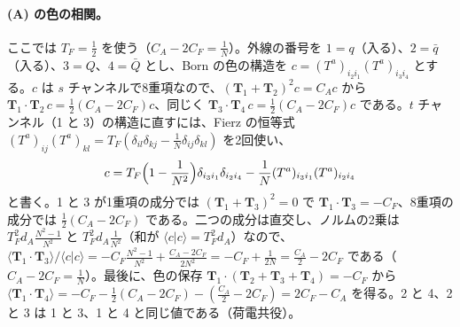 \documentclass[a4paper,10pt]{ltjsarticle}
\begin{document}
\paragraph{(A) の色の相関。}ここでは $T_F=\frac12$ を使う（$C_A-2C_F=\frac1N$）。外線の番号を $1=q$（入る）、$2=\bar q$（入る）、$3=Q$、$4=\bar Q$ とし、Born の色の構造を $c=(T^a)_{i_2i_1}(T^a)_{i_3i_4}$ とする。$c$ は $s$ チャンネルで8重項なので、$(\boldsymbol T_1+\boldsymbol T_2)^2c=C_Ac$ から $\boldsymbol T_1\cdot\boldsymbol T_2\,c=\frac12(C_A-2C_F)c$、同じく $\boldsymbol T_3\cdot\boldsymbol T_4\,c=\frac12(C_A-2C_F)c$ である。$t$ チャンネル（1 と 3）の構造に直すには、Fierz の恒等式 $(T^a)_{ij}(T^a)_{kl}=T_F(\delta_{il}\delta_{kj}-\frac1N\delta_{ij}\delta_{kl})$ を2回使い、
\begin{equation*}
c=T_F\Bigl(1-\frac1{N^2}\Bigr)\delta_{i_3i_1}\delta_{i_2i_4}-\frac1N(T^a)_{i_3i_1}(T^a)_{i_2i_4}
\end{equation*}
と書く。1 と 3 が1重項の成分では $(\boldsymbol T_1+\boldsymbol T_3)^2=0$ で $\boldsymbol T_1\cdot\boldsymbol T_3=-C_F$、8重項の成分では $\frac12(C_A-2C_F)$ である。二つの成分は直交し、ノルムの2乗は $T_F^2d_A\frac{N^2-1}{N^2}$ と $T_F^2d_A\frac1{N^2}$（和が $\langle c|c\rangle=T_F^2d_A$）なので、$\langle\boldsymbol T_1\cdot\boldsymbol T_3\rangle/\langle c|c\rangle=-C_F\frac{N^2-1}{N^2}+\frac{C_A-2C_F}{2N^2}=-C_F+\frac1{2N}=\frac{C_A}2-2C_F$ である（$C_A-2C_F=\frac1N$）。最後に、色の保存 $\boldsymbol T_1\cdot(\boldsymbol T_2+\boldsymbol T_3+\boldsymbol T_4)=-C_F$ から $\langle\boldsymbol T_1\cdot\boldsymbol T_4\rangle=-C_F-\frac12(C_A-2C_F)-(\frac{C_A}2-2C_F)=2C_F-C_A$ を得る。2 と 4、2 と 3 は 1 と 3、1 と 4 と同じ値である（荷電共役）。
\end{document}
